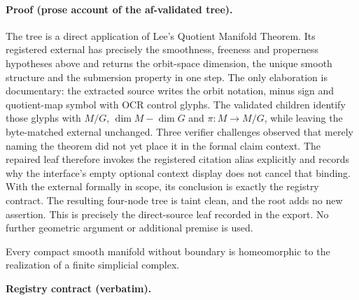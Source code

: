 \paragraph{Proof (prose account of the af-validated tree).}
The tree is a direct application of Lee's Quotient Manifold Theorem.
Its registered external has precisely the smoothness, freeness and properness
hypotheses above and returns the orbit-space dimension, the unique smooth structure
and the submersion property in one step.  The only elaboration is documentary:
the extracted source writes the orbit notation, minus sign and quotient-map symbol
with OCR control glyphs.  The validated children identify those glyphs with $M/G$,
$\dim M-\dim G$ and $\pi:M\to M/G$, while leaving the byte-matched external
unchanged.  Three verifier challenges observed that merely naming the theorem did
not yet place it in the formal claim context.  The repaired leaf therefore invokes
the registered citation alias explicitly and records why the interface's empty
optional context display does not cancel that binding.  With the external formally
in scope, its conclusion is exactly the registry contract.
The resulting four-node tree is taint clean, and the root adds no new assertion.
This is precisely the direct-source leaf recorded in the export.
No further geometric argument or additional premise is used.

\begin{lemma}\label{lem:topology-finite-triangulation}
Every compact smooth manifold without boundary is homeomorphic to the realization of
a finite simplicial complex.
\end{lemma}

\noindent\textbf{Registry contract (verbatim).}

